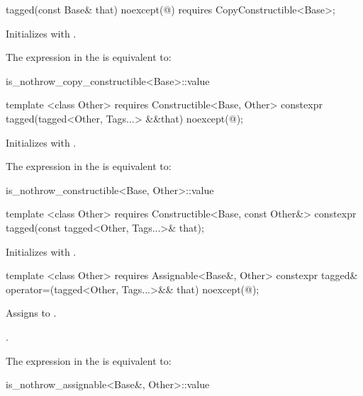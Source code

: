 \begin{itemdecl}
tagged(const Base& that) noexcept(@\seebelow@)
  requires CopyConstructible<Base>;
\end{itemdecl}

\begin{itemdescr}
\pnum
\effects Initializes  with .

\pnum
\remarks The expression in the  is equivalent to:

\begin{codeblock}
is_nothrow_copy_constructible<Base>::value
\end{codeblock}
\end{itemdescr}

\begin{itemdecl}
template <class Other>
  requires Constructible<Base, Other>
constexpr tagged(tagged<Other, Tags...> &&that) noexcept(@\seebelow@);
\end{itemdecl}

\begin{itemdescr}
\pnum
\effects Initializes  with .

\pnum
\remarks The expression in the  is equivalent to:

\begin{codeblock}
is_nothrow_constructible<Base, Other>::value
\end{codeblock}
\end{itemdescr}

\begin{itemdecl}
template <class Other>
  requires Constructible<Base, const Other&>
constexpr tagged(const tagged<Other, Tags...>& that);
\end{itemdecl}

\begin{itemdescr}
\pnum
\effects Initializes  with .
\end{itemdescr}

\begin{itemdecl}
template <class Other>
  requires Assignable<Base&, Other>
constexpr tagged& operator=(tagged<Other, Tags...>&& that) noexcept(@\seebelow@);
\end{itemdecl}

\begin{itemdescr}
\pnum
\effects Assigns  to .

\pnum
\returns {}.

\pnum
\remarks The expression in the  is equivalent to:

\begin{codeblock}
is_nothrow_assignable<Base&, Other>::value
\end{codeblock}
\end{itemdescr}

